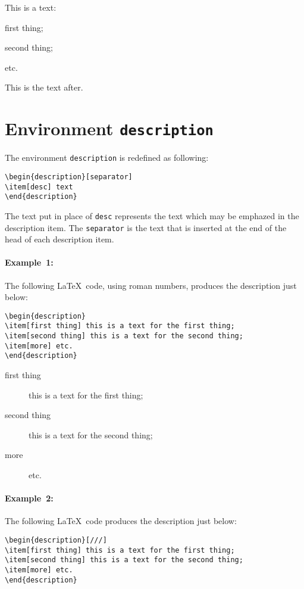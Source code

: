 \documentclass[book]{upmethodology-document}
\begin{document}
This is a text: \begin{inlineenumeration}
\item first thing;
\item second thing;
\item etc.
\end{inlineenumeration} This is the text after.

\section{Environment \texttt{description}}

The environment \texttt{description} is redefined as following:
\begin{verbatim}
\begin{description}[separator]
\item[desc] text
\end{description}
\end{verbatim}
The text put in place of \texttt{desc} represents the text which may be emphazed in the description item.
The \texttt{separator} is the text that is inserted at the end of the head of each description item.


\paragraph{Example~1:} The following \LaTeX~code, using roman numbers, produces the description just below:
\begin{verbatim}
\begin{description}
\item[first thing] this is a text for the first thing;
\item[second thing] this is a text for the second thing;
\item[more] etc.
\end{description}
\end{verbatim}

\begin{description}
\item[first thing] this is a text for the first thing;
\item[second thing] this is a text for the second thing;
\item[more] etc.
\end{description}

\paragraph{Example~2:} The following \LaTeX~code produces the description just below:
\begin{verbatim}
\begin{description}[///]
\item[first thing] this is a text for the first thing;
\item[second thing] this is a text for the second thing;
\item[more] etc.
\end{description}
\end{verbatim}
\end{document}
